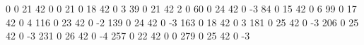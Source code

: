 0 0 21 42 0 0
21 0 18 42 0 3
39 0 21 42 2 0
60 0 24 42 0 -3
84 0 15 42 0 6
99 0 17 42 0 4
116 0 23 42 0 -2
139 0 24 42 0 -3
163 0 18 42 0 3
181 0 25 42 0 -3
206 0 25 42 0 -3
231 0 26 42 0 -4
257 0 22 42 0 0
279 0 25 42 0 -3